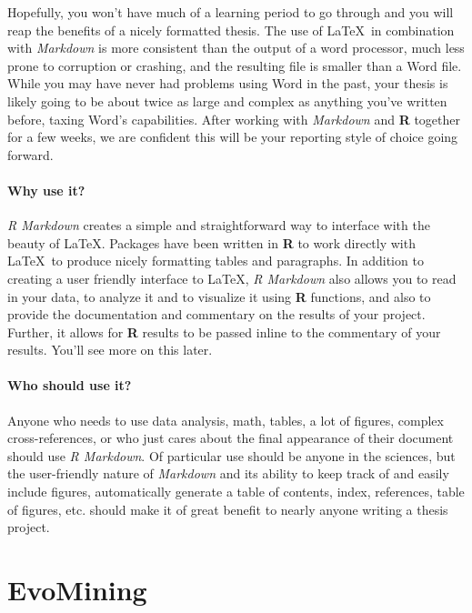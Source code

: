 \documentclass[12pt,twoside]{reedthesis}
\begin{document}
  Hopefully, you won't have much of a learning period to go through and
  you will reap the benefits of a nicely formatted thesis. The use of
  \LaTeX~in combination with \emph{Markdown} is more consistent than the
  output of a word processor, much less prone to corruption or crashing,
  and the resulting file is smaller than a Word file. While you may have
  never had problems using Word in the past, your thesis is likely going
  to be about twice as large and complex as anything you've written
  before, taxing Word's capabilities. After working with \emph{Markdown}
  and \textbf{R} together for a few weeks, we are confident this will be
  your reporting style of choice going forward.
  
  \subsubsection{Why use it?}\label{why-use-it}
  
  \emph{R Markdown} creates a simple and straightforward way to interface
  with the beauty of \LaTeX. Packages have been written in \textbf{R} to
  work directly with \LaTeX~to produce nicely formatting tables and
  paragraphs. In addition to creating a user friendly interface to \LaTeX,
  \emph{R Markdown} also allows you to read in your data, to analyze it
  and to visualize it using \textbf{R} functions, and also to provide the
  documentation and commentary on the results of your project. Further, it
  allows for \textbf{R} results to be passed inline to the commentary of
  your results. You'll see more on this later.
  
  \subsubsection{Who should use it?}\label{who-should-use-it}
  
  Anyone who needs to use data analysis, math, tables, a lot of figures,
  complex cross-references, or who just cares about the final appearance
  of their document should use \emph{R Markdown}. Of particular use should
  be anyone in the sciences, but the user-friendly nature of
  \emph{Markdown} and its ability to keep track of and easily include
  figures, automatically generate a table of contents, index, references,
  table of figures, etc. should make it of great benefit to nearly anyone
  writing a thesis project.
  
  \chapter{EvoMining}\label{rmd-basics}
  
\end{document}
